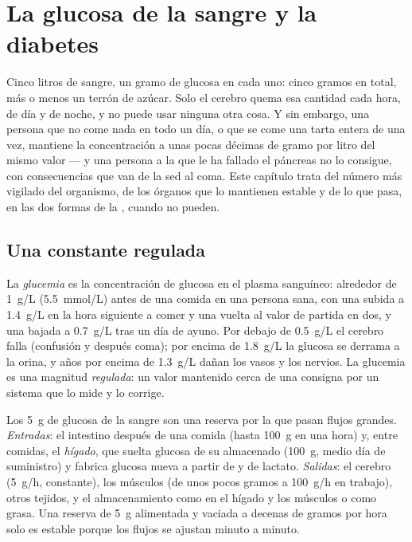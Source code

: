 \chapter{La glucosa de la sangre y la diabetes}\label{ch:g12:glucose-and-diabetes}

Cinco litros de sangre, un gramo de glucosa en cada uno: cinco gramos
en total, más o menos un terrón de azúcar. Solo el cerebro quema esa
cantidad cada hora, de día y de noche, y no puede usar ninguna otra
cosa. Y sin embargo, una persona que no come nada en todo un día, o que
se come una tarta entera de una vez, mantiene la concentración a unas
pocas décimas de gramo por litro del mismo valor --- y una persona a la
que le ha fallado el páncreas no lo consigue, con consecuencias que van
de la sed al coma. Este capítulo trata del número más vigilado del
organismo, de los órganos que lo mantienen estable y de lo que pasa, en
las dos formas de la , cuando no pueden.

\section{Una constante regulada}

\begin{definition}[Glucemia]\label{def:g12:glucose-and-diabetes:glycaemia}
La \emph{glucemia} es la concentración de glucosa en el
plasma sanguíneo: alrededor de \qty{1}{g/L} (\qty{5.5}{mmol/L}) antes
de una comida en una persona sana, con una subida a \qty{1.4}{g/L} en
la hora siguiente a comer y una vuelta al valor de partida en dos, y
una bajada a \qty{0.7}{g/L} tras un día de ayuno. Por debajo de
\qty{0.5}{g/L} el cerebro falla (confusión y después coma); por encima
de \qty{1.8}{g/L} la glucosa se derrama a la orina, y años por encima
de \qty{1.3}{g/L} dañan los vasos y los nervios. La glucemia es una
magnitud \emph{regulada}: un valor mantenido cerca de una consigna por
un sistema que lo mide y lo corrige.
\end{definition}

\begin{proposition}\label{prop:g12:glucose-and-diabetes:pool}
Los \qty{5}{g} de glucosa de la sangre son una reserva por la que pasan
flujos grandes. \emph{Entradas}: el intestino después de una comida
(hasta \qty{100}{g} en una hora) y, entre comidas, el \emph{hígado},
que suelta glucosa de su \emph{} almacenado (\qty{100}{g},
medio día de suministro) y fabrica glucosa nueva a partir de
 y de lactato. \emph{Salidas}: el cerebro (\qty{5}{g/h},
constante), los músculos (de unos pocos gramos a \qty{100}{g/h} en
trabajo), otros tejidos, y el almacenamiento como  en el
hígado y los músculos o como grasa. Una reserva de \qty{5}{g}
alimentada y vaciada a decenas de gramos por hora solo es estable
porque los flujos se ajustan minuto a minuto.
\end{proposition}
\admitted

